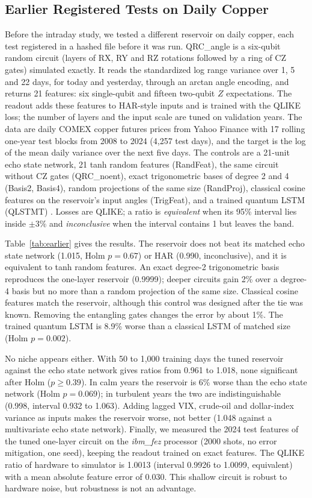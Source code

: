 \documentclass{ieeeaccess}
\begin{document}
\subsection{Earlier Registered Tests on Daily Copper}
\label{sec:res-earlier}
Before the intraday study, we tested a different reservoir on daily copper, each test registered in a hashed file before it was run. QRC\_angle is a six-qubit random circuit (layers of RX, RY and RZ rotations followed by a ring of CZ gates) simulated exactly. It reads the standardized log range variance over 1, 5 and 22 days, for today and yesterday, through an arctan angle encoding, and returns 21 features: six single-qubit and fifteen two-qubit $Z$ expectations. The readout adds these features to HAR-style inputs and is trained with the QLIKE loss; the number of layers and the input scale are tuned on validation years. The data are daily COMEX copper futures prices from Yahoo Finance with 17 rolling one-year test blocks from 2008 to 2024 (4,257 test days), and the target is the log of the mean daily variance over the next five days. The controls are a 21-unit echo state network, 21 tanh random features (RandFeat), the same circuit without CZ gates (QRC\_noent), exact trigonometric bases of degree 2 and 4 (Basis2, Basis4), random projections of the same size (RandProj), classical cosine features on the reservoir's input angles (TrigFeat), and a trained quantum LSTM (QLSTMT) \cite{chen2020}. Losses are QLIKE; a ratio is \emph{equivalent} when its 95\% interval lies inside $\pm3\%$ and \emph{inconclusive} when the interval contains 1 but leaves the band.

Table~\ref{tab:earlier} gives the results. The reservoir does not beat its matched echo state network (1.015, Holm $p=0.67$) or HAR (0.990, inconclusive), and it is equivalent to tanh random features. An exact degree-2 trigonometric basis reproduces the one-layer reservoir (0.9999); deeper circuits gain 2\% over a degree-4 basis but no more than a random projection of the same size. Classical cosine features match the reservoir, although this control was designed after the tie was known. Removing the entangling gates changes the error by about 1\%. The trained quantum LSTM is 8.9\% worse than a classical LSTM of matched size (Holm $p=0.002$).

No niche appears either. With 50 to 1,000 training days the tuned reservoir against the echo state network gives ratios from 0.961 to 1.018, none significant after Holm ($p\geq0.39$). In calm years the reservoir is 6\% worse than the echo state network (Holm $p=0.069$); in turbulent years the two are indistinguishable (0.998, interval 0.932 to 1.063). Adding lagged VIX, crude-oil and dollar-index variance as inputs makes the reservoir worse, not better (1.048 against a multivariate echo state network). Finally, we measured the 2024 test features of the tuned one-layer circuit on the \emph{ibm\_fez} processor (2000 shots, no error mitigation, one seed), keeping the readout trained on exact features. The QLIKE ratio of hardware to simulator is 1.0013 (interval 0.9926 to 1.0099, equivalent) with a mean absolute feature error of 0.030. This shallow circuit is robust to hardware noise, but robustness is not an advantage.
\end{document}
